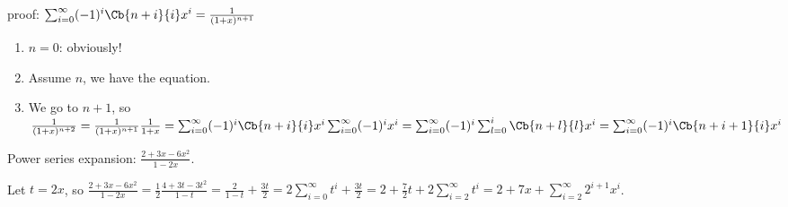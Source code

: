 \documentclass{ctexart}
\newif\ifpreface
\begin{document}
\large
\setlength{\baselineskip}{1.2em}
\ifpreface
    
    \newgeometry{left=2cm,right=2cm,top=2cm,bottom=2cm}
\else
{}
\maketitle
\fi

\begin{problem}
    proof: $\sum_{i=0}^{\infty}(-1)^i\Cb{n+i}{i}x^i=\frac{1}{(1+x)^{n+1}}$
\end{problem}
\begin{solution}
    \begin{enumerate}
        \item $n=0$: obviously!
        \item Assume $n$, we have the equation.
        \item We go to $n+1$, so $
                \frac{1}{(1+x)^{n+2}}=\frac{1}{(1+x)^{n+1}}\frac{1}{1+x}
                =\sum_{i=0}^{\infty}(-1)^i\Cb{n+i}{i}x^i\sum_{i=0}^{\infty}(-1)^ix^i=\sum_{i=0}^{\infty}(-1)^i\sum_{l=0}^i\Cb{n+l}{l}x^i=\sum_{i=0}^{\infty}(-1)^i\Cb{n+i+1}{i}x^i$

    \end{enumerate}
\end{solution}

\begin{problem}
    Power series expansion: $\frac{2+3x-6x^2}{1-2x}$.
\end{problem}
\begin{solution}
Let $t=2x$, so $\frac{2+3x-6x^2}{1-2x}=\frac{1}{2}\frac{4+3t-3t^2}{1-t}=\frac{2}{1-t}+\frac{3t}{2}=2\sum_{i=0}^{\infty}t^i+\frac{3t}{2}=2+\frac{7}{2}t+2\sum_{i=2}^{\infty}t^i=2+7x+\sum_{i=2}^{\infty}2^{i+1}x^i$.
\end{solution}
\end{document}
